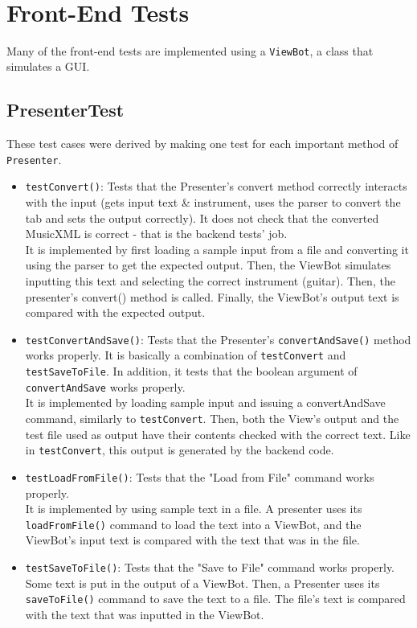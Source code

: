 \documentclass[11pt]{article}
\date{\today}
\title{}
\begin{document}
\tableofcontents

\newpage\\
\section{Front-End Tests}
\label{sec:orgb2de03a}
Many of the front-end tests are implemented using a \texttt{ViewBot}, a class that simulates a GUI.\\
\subsection{PresenterTest}
\label{sec:orgf38f026}
These test cases were derived by making one test for each important method of \texttt{Presenter}.\\
\begin{itemize}
\item \texttt{testConvert()}: Tests that the Presenter's convert method correctly interacts with the input (gets input text \& instrument, uses the parser to convert the tab and sets the output correctly).  It does not check that the converted MusicXML is correct - that is the backend tests' job.\\
It is implemented by first loading a sample input from a file and converting it using the parser to get the expected output.  Then, the ViewBot simulates inputting this text and selecting the correct instrument (guitar).  Then, the presenter's convert() method is called.  Finally, the ViewBot's output text is compared with the expected output.\\
\item \texttt{testConvertAndSave()}: Tests that the Presenter's \texttt{convertAndSave()} method works properly.  It is basically a combination of \texttt{testConvert} and \texttt{testSaveToFile}.  In addition, it tests that the boolean argument of \texttt{convertAndSave} works properly.\\
It is implemented by loading sample input and issuing a convertAndSave command, similarly to \texttt{testConvert}.  Then, both the View's output and the test file used as output have their contents checked with the correct text.  Like in \texttt{testConvert}, this output is generated by the backend code.\\
\item \texttt{testLoadFromFile()}: Tests that the "Load from File" command works properly.\\
It is implemented by using sample text in a file.  A presenter uses its \texttt{loadFromFile()} command to load the text into a ViewBot, and the ViewBot's input text is compared with the text that was in the file.\\
\item \texttt{testSaveToFile()}: Tests that the "Save to File" command works properly.\\
Some text is put in the output of a ViewBot.  Then, a Presenter uses its \texttt{saveToFile()} command to save the text to a file.  The file's text is compared with the text that was inputted in the ViewBot.\\
\end{itemize}
\end{document}
